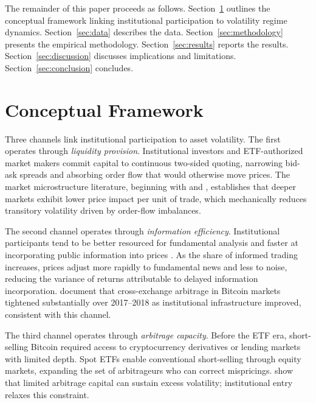 \documentclass[12pt,a4paper]{article}
\begin{document}
The remainder of this paper proceeds as follows. Section~\ref{sec:framework}
outlines the conceptual framework linking institutional participation to
volatility regime dynamics. Section~\ref{sec:data} describes the data.
Section~\ref{sec:methodology} presents the empirical methodology.
Section~\ref{sec:results} reports the results.
Section~\ref{sec:discussion} discusses implications and limitations.
Section~\ref{sec:conclusion} concludes.

\FloatBarrier

\section{Conceptual Framework}\label{sec:framework}

Three channels link institutional participation to asset volatility. The
first operates through \emph{liquidity provision}. Institutional investors
and ETF-authorized market makers commit capital to continuous two-sided
quoting, narrowing bid-ask spreads and absorbing order flow that would
otherwise move prices. The market microstructure literature, beginning with
\citet{kyle1985continuous} and \citet{glosten1985bid}, establishes that
deeper markets exhibit lower price impact per unit of trade, which
mechanically reduces transitory volatility driven by order-flow imbalances.

The second channel operates through \emph{information efficiency}.
Institutional participants tend to be better resourced for fundamental
analysis and faster at incorporating public information into prices
\citep{barber2008attention}. As the share of informed trading increases,
prices adjust more rapidly to fundamental news and less to noise, reducing
the variance of returns attributable to delayed information incorporation.
\citet{makarov2020trading} document that cross-exchange arbitrage in
Bitcoin markets tightened substantially over 2017--2018 as institutional
infrastructure improved, consistent with this channel.

The third channel operates through \emph{arbitrage capacity}. Before the
ETF era, short-selling Bitcoin required access to cryptocurrency derivatives
or lending markets with limited depth. Spot ETFs enable conventional
short-selling through equity markets, expanding the set of arbitrageurs who
can correct mispricings. \citet{shleifer1997limits} show that limited
arbitrage capital can sustain excess volatility; institutional entry relaxes
this constraint.
\end{document}
